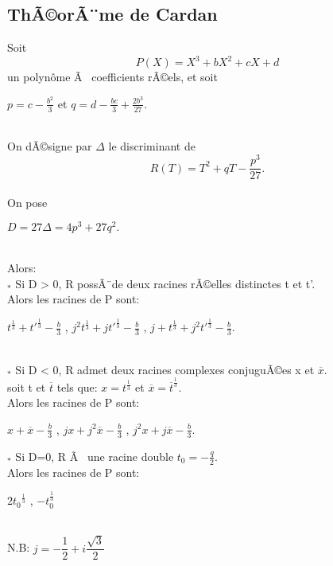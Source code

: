 \documentclass[12pt,a4paper,oneside]{book}
\begin{document}
\begin{titlepage}
\section*{ThÃ©orÃ¨me de Cardan}
 Soit $$ P(X)=X^3+bX^2+cX+d $$ un polyn\^ome Ã  coefficients rÃ©els, et soit \\ 
  \begin{center}
\( p=c-\frac{b^2}{3}\) \hspace{1,5\baselineskip} et \hspace{1,5\baselineskip} \(q=d-\frac{bc}{3}+\frac{2b^3}{27}\).
\end{center} \\
On dÃ©signe par $\Delta$ le discriminant de  
\[R(T)=T^2+qT-\frac{p^3}{27}.\]\\
On pose \begin{center}
$D=27\Delta=4p^3+27q^2.$
\end{center} \\
Alors: \\
$_*$ Si D > 0, R possÃ¨de deux racines rÃ©elles distinctes t et t'.\\ Alors les racines de P sont:\\
 \begin{center}
 $t^{\frac{1}{3}}+{t'}^{\frac{1}{3}}-\frac{b}{3}$ \hspace{2\baselineskip},\hspace{2\baselineskip}  $j^2t^{\frac{1}{3}}+j {t'}^{\frac{1}{3}}-\frac{b}{3}$ \hspace{2\baselineskip},\hspace{2\baselineskip} $j+t^{\frac{1}{3}}+j^2{t'}^{\frac{1}{3}}-\frac{b}{3}.$ 
  \end{center} \\
 $_*$ Si D < 0, R admet deux racines complexes conjuguÃ©es x et $\overline{x}$.\\ soit t et $\overline{t}$ tels que: $x={t}^{\frac{1}{3}}$ et $\overline{x}={\overline{t}}^{\frac{1}{3}}$.\\
 Alors les racines de P sont:\\
 \begin{center}
 $x+\overline{x}-\frac{b}{3}$\hspace{1,5\baselineskip} ,\hspace{1,5\baselineskip} $jx+j^2 \overline{x}-\frac{b}{3}$ \hspace{1,5\baselineskip} , \hspace{1,5\baselineskip} $j^2x+j\overline{x}-\frac{b}{3}$.
 \end{center}
 $_*$ Si D=0, R Ã  une racine double $t_0=-\frac{q}{2}$.
 \\ Alors les racines de P sont:\\
 \begin{center}
 $2{t_0}^{\frac{1}{3}}$ \hspace{1,5\baselineskip} , \hspace{1,5\baselineskip} $-t_0^{\frac{1}{3}}$
 \end{center} \\
  N.B: \hspace{2\baselineskip} $j=-\dfrac{1}{2}+i\dfrac{\sqrt{3}}{2}$
\end{titlepage}
\end{document}
